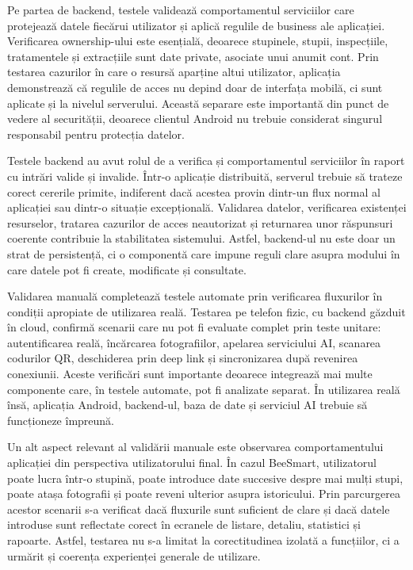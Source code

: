Pe partea de backend, testele validează comportamentul serviciilor care protejează datele fiecărui utilizator și aplică regulile de business ale aplicației. Verificarea ownership-ului este esențială, deoarece stupinele, stupii, inspecțiile, tratamentele și extracțiile sunt date private, asociate unui anumit cont. Prin testarea cazurilor în care o resursă aparține altui utilizator, aplicația demonstrează că regulile de acces nu depind doar de interfața mobilă, ci sunt aplicate și la nivelul serverului. Această separare este importantă din punct de vedere al securității, deoarece clientul Android nu trebuie considerat singurul responsabil pentru protecția datelor.

Testele backend au avut rolul de a verifica și comportamentul serviciilor în raport cu intrări valide și invalide. Într-o aplicație distribuită, serverul trebuie să trateze corect cererile primite, indiferent dacă acestea provin dintr-un flux normal al aplicației sau dintr-o situație excepțională. Validarea datelor, verificarea existenței resurselor, tratarea cazurilor de acces neautorizat și returnarea unor răspunsuri coerente contribuie la stabilitatea sistemului. Astfel, backend-ul nu este doar un strat de persistență, ci o componentă care impune reguli clare asupra modului în care datele pot fi create, modificate și consultate.

Validarea manuală completează testele automate prin verificarea fluxurilor în condiții apropiate de utilizarea reală. Testarea pe telefon fizic, cu backend găzduit în cloud, confirmă scenarii care nu pot fi evaluate complet prin teste unitare: autentificarea reală, încărcarea fotografiilor, apelarea serviciului AI, scanarea codurilor QR, deschiderea prin deep link și sincronizarea după revenirea conexiunii. Aceste verificări sunt importante deoarece integrează mai multe componente care, în testele automate, pot fi analizate separat. În utilizarea reală însă, aplicația Android, backend-ul, baza de date și serviciul AI trebuie să funcționeze împreună.

Un alt aspect relevant al validării manuale este observarea comportamentului aplicației din perspectiva utilizatorului final. În cazul BeeSmart, utilizatorul poate lucra într-o stupină, poate introduce date succesive despre mai mulți stupi, poate atașa fotografii și poate reveni ulterior asupra istoricului. Prin parcurgerea acestor scenarii s-a verificat dacă fluxurile sunt suficient de clare și dacă datele introduse sunt reflectate corect în ecranele de listare, detaliu, statistici și rapoarte. Astfel, testarea nu s-a limitat la corectitudinea izolată a funcțiilor, ci a urmărit și coerența experienței generale de utilizare.

